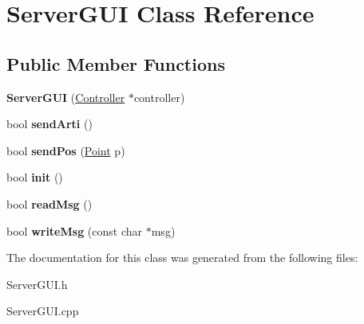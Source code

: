 \hypertarget{class_server_g_u_i}{}\section{Server\+G\+UI Class Reference}
\label{class_server_g_u_i}
\subsection*{Public Member Functions}
\begin{DoxyCompactItemize}
\item 
\mbox{\label{class_server_g_u_i_ae46f8aeebf57f03bc95f8eab10e9006f}} 
{\bfseries Server\+G\+UI} (\mbox{\hyperlink{class_controller}{Controller}} $\ast$controller)
\item 
\mbox{\label{class_server_g_u_i_a807ba20641df36d96c2203a297212885}} 
bool {\bfseries send\+Arti} ()
\item 
\mbox{\label{class_server_g_u_i_a02b5f42026cd280e3f3c80a71fb7da75}} 
bool {\bfseries send\+Pos} (\mbox{\hyperlink{struct_point}{Point}} p)
\item 
\mbox{\label{class_server_g_u_i_a58a6de1f88cc5c8388cdc6aec38f0ced}} 
bool {\bfseries init} ()
\item 
\mbox{\label{class_server_g_u_i_a4d1d5c0d9e5cdf8678a0246b487a02d3}} 
bool {\bfseries read\+Msg} ()
\item 
\mbox{\label{class_server_g_u_i_aa8347145569f0d58ae9c7a891f24280c}} 
bool {\bfseries write\+Msg} (const char $\ast$msg)
\end{DoxyCompactItemize}


The documentation for this class was generated from the following files\+:\begin{DoxyCompactItemize}
\item 
Server\+G\+U\+I.\+h\item 
Server\+G\+U\+I.\+cpp\end{DoxyCompactItemize}
